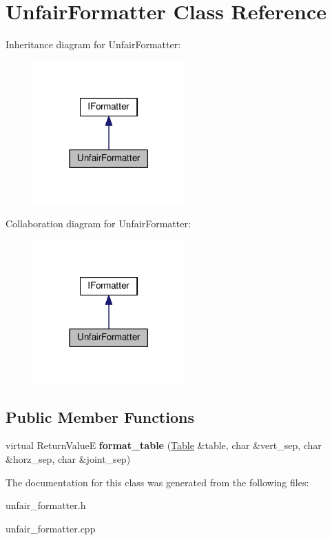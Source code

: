 \hypertarget{classUnfairFormatter}{}\section{Unfair\+Formatter Class Reference}
\label{classUnfairFormatter}


Inheritance diagram for Unfair\+Formatter\+:\nopagebreak
\begin{figure}[H]
\begin{center}
\leavevmode
\includegraphics[width=165pt]{classUnfairFormatter__inherit__graph}
\end{center}
\end{figure}


Collaboration diagram for Unfair\+Formatter\+:\nopagebreak
\begin{figure}[H]
\begin{center}
\leavevmode
\includegraphics[width=165pt]{classUnfairFormatter__coll__graph}
\end{center}
\end{figure}
\subsection*{Public Member Functions}
\begin{DoxyCompactItemize}
\item 
\hypertarget{classUnfairFormatter_a3dc95e05cfcc097fbfc9c2d195a69453}{}virtual Return\+Value\+E {\bfseries format\+\_\+table} (\hyperlink{classTable}{Table} \&table, char \&vert\+\_\+sep, char \&horz\+\_\+sep, char \&joint\+\_\+sep)\label{classUnfairFormatter_a3dc95e05cfcc097fbfc9c2d195a69453}

\end{DoxyCompactItemize}


The documentation for this class was generated from the following files\+:\begin{DoxyCompactItemize}
\item 
unfair\+\_\+formatter.\+h\item 
unfair\+\_\+formatter.\+cpp\end{DoxyCompactItemize}
